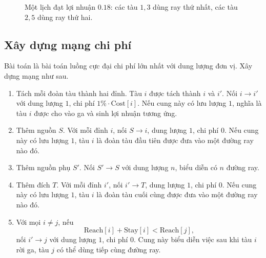 \documentclass[11pt]{article}
\begin{document}
\begin{figure}[ht]
\centering
{}
\caption{Một lịch đạt lợi nhuận \(0.18\): các tàu \(1,3\) dùng ray thứ nhất, các tàu \(2,5\) dùng ray thứ hai.}
\end{figure}

\subsection{Xây dựng mạng chi phí}

Bài toán là bài toán luồng cực đại chi phí lớn nhất với dung lượng đơn vị.
Xây dựng mạng như sau.

\begin{enumerate}
  \item Tách mỗi đoàn tàu thành hai đỉnh. Tàu \(i\) được tách thành \(i\) và
  \(i'\). Nối \(i\to i'\) với dung lượng \(1\), chi phí
  \(1\%\cdot \mathrm{Cost}[i]\). Nếu cung này có lưu lượng \(1\), nghĩa là
  tàu \(i\) được cho vào ga và sinh lợi nhuận tương ứng.
  \item Thêm nguồn \(S\). Với mỗi đỉnh \(i\), nối \(S\to i\), dung lượng
  \(1\), chi phí \(0\). Nếu cung này có lưu lượng \(1\), tàu \(i\) là đoàn
  tàu đầu tiên được đưa vào một đường ray nào đó.
  \item Thêm nguồn phụ \(S'\). Nối \(S'\to S\) với dung lượng \(n\), biểu
  diễn có \(n\) đường ray.
  \item Thêm đích \(T\). Với mỗi đỉnh \(i'\), nối \(i'\to T\), dung lượng
  \(1\), chi phí \(0\). Nếu cung này có lưu lượng \(1\), tàu \(i\) là đoàn
  tàu cuối cùng được đưa vào một đường ray nào đó.
  \item Với mọi \(i\ne j\), nếu
  \[
    \mathrm{Reach}[i]+\mathrm{Stay}[i]<\mathrm{Reach}[j],
  \]
  nối \(i'\to j\) với dung lượng \(1\), chi phí \(0\). Cung này biểu diễn
  việc sau khi tàu \(i\) rời ga, tàu \(j\) có thể dùng tiếp cùng đường ray.
\end{enumerate}
\end{document}
